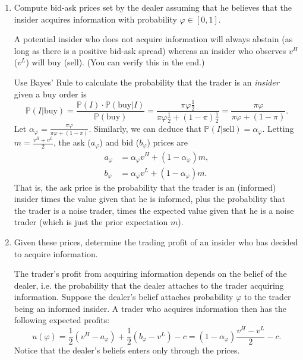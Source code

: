 \documentclass[11pt
, answers
]{exam}
\begin{document}
\begin{enumerate} [label=(\alph*). ]

\item Compute bid-ask prices set by the dealer assuming that he believes that the insider acquires information with probability $\varphi \in [0,1]$.

\begin{solution}
A potential insider who does not acquire information will always abstain (as long as there is a positive bid-ask spread) whereas an insider who observes $v^H$ ($v^L$) will buy (sell). (You can verify this in the end.)

Use Bayes' Rule to calculate the probability that the trader is an \textit{insider} given a buy order is
\[
\mathbb{P}(I|\text{buy}) = \frac{\mathbb{P}(I) \cdot \mathbb{P}(\text{buy}|I)}{\mathbb{P}(\text{buy})} =\frac{\pi \varphi \frac{1}{2}}{\pi \varphi \frac{1}{2} + (1-\pi)\frac{1}{2}} = \frac{\pi \varphi }{\pi \varphi  + (1-\pi)}.
\]
Let $\alpha_\varphi = \frac{\pi \varphi }{\pi \varphi  + (1-\pi)}$. Similarly, we can deduce that $\mathbb{P}(I|\text{sell})=\alpha_\varphi$. Letting $m=\frac{v^H+v^L}{2}$, the ask ($a_\varphi$) and bid ($b_\varphi$) prices are
\begin{align*}
a_\varphi & = \alpha_\varphi v^H+(1-\alpha_\varphi) m, \\
b_\varphi & = \alpha_\varphi v^L+(1-\alpha_\varphi) m.
\end{align*}
That is, the ask price is the probability that the trader is an (informed) insider times the value given that he is informed, plus the probability that the trader is a noise trader, times the expected value  given that he is a noise trader (which is just the prior expectation $m$).
\end{solution}

\item Given these prices, determine the trading profit of an insider who has decided to acquire information.

\begin{solution}
The trader's profit from acquiring information depends on the belief of the dealer, i.e. the probability that the dealer attaches to the trader acquiring information. Suppose the dealer's belief attaches probability $\varphi$ to the trader being an informed insider. A trader who acquires information then has the following expected profits:
\[
u(\varphi) = \frac{1}{2}(v^H - a_\varphi) + \frac{1}{2}(b_\varphi - v^L) - c = (1-\alpha_\varphi) \frac{v^H-v^L}{2}-c.
\]
Notice that the dealer's beliefs enters only through the prices.
\end{solution}


\end{enumerate}
\end{document}
